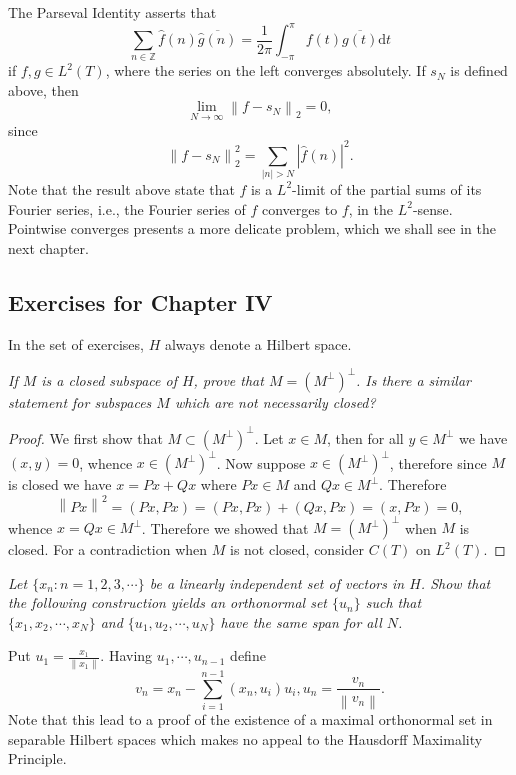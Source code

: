 The Parseval Identity asserts that 
$$
\sum_{n\in \mathbb{Z}}{\widehat{f}\left( n \right) \overline{\widehat{g}\left( n \right) }}=\frac{1}{2\pi}\int_{-\pi}^{\pi}{f\left( t \right) \overline{g\left( t \right) }\mathrm{d}t}
$$
if $f,g\in L^2(T)$, where the series on the left converges absolutely. If $s_N$ is defined above, then 
$$
\lim_{N\rightarrow \infty} \left\| f-s_N \right\| _2=0,
$$
since 
$$
\left\| f-s_N \right\| _{2}^{2}=\sum_{\left| n \right|>N}{\left| \widehat{f}\left( n \right) \right|^2}.
$$
Note that the result above state that $f$ is a $L^2$-limit of the partial sums of its Fourier series, i.e., the Fourier series of $f$ converges to $f$, in the $L^2$-sense. Pointwise converges presents a more delicate problem, which we shall see in the next chapter.
\subsection{Exercises for Chapter IV}
In the set of exercises, $H$ always denote a Hilbert space.
\begin{problem}\em
If $M$ is a closed subspace of $H$, prove that $M=(M^\perp)^\perp$. Is there a similar statement for subspaces $M$ which are not necessarily closed?
\end{problem}
\begin{proof}
We first show that $M\subset(M^\perp)^\perp$. Let $x\in M$, then for all $y\in M^\perp$ we have $(x,y)=0$, whence $x\in(M^\perp)^\perp$. Now suppose $x\in(M^\perp)^\perp$, therefore since $M$ is closed we have $x=Px+Qx$ where $Px\in M$ and $Qx\in M^\perp$. Therefore 
$$
\left\| Px \right\| ^2=\left( Px,Px \right) =\left( Px,Px \right) +\left( Qx,Px \right) =\left( x,Px \right) =0,
$$
whence $x=Qx\in M^\perp$. Therefore we showed that $M=(M^\perp)^\perp$ when $M$ is closed. For a contradiction when $M$ is not closed, consider $C(T)$ on $L^2(T)$.
\end{proof}
\begin{problem}\em
Let $\{x_n:n=1,2,3,\cdots\}$ be a linearly independent set of vectors in $H$. Show that the following construction yields an orthonormal set $\{u_n\}$ such that $\{x_1,x_2,\cdots,x_N\}$ and $\{u_1,u_2,\cdots,u_N\}$ have the same span for all $N$.\par
Put $u_1=\frac{x_1}{\|x_1\|}$. Having $u_1,\cdots,u_{n-1}$ define 
$$
v_n=x_n-\sum_{i=1}^{n-1}{\left( x_n,u_i \right) u_i},u_n=\frac{v_n}{\left\| v_n \right\|}.
$$
Note that this lead to a proof of the existence of a maximal orthonormal set in separable Hilbert spaces which makes no appeal to the Hausdorff Maximality Principle.
\end{problem}
